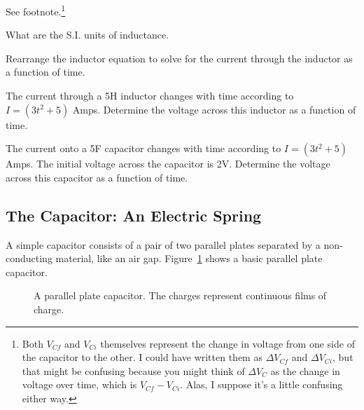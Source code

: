 See footnote.\footnote{Both $V_{Cf}$ and $V_{Ci}$ themselves represent the change in voltage from one side of the capacitor to the other. I could have written them as $\Delta V_{Cf}$ and $\Delta V_{Ci}$, but that might be confusing because you might think of $\Delta V_C$ as the change in voltage over time, which is $V_{Cf}-V_{Ci}$. Alas, I suppose it's a little confusing either way.}

\begin{alevel}
What are the S.I. units of inductance.
\end{alevel}

\begin{clevel}
Rearrange the inductor equation to solve for the current through the inductor as a function of time.
\end{clevel}

\begin{blevel}
The current through a 5H inductor changes with time according to $I=(3t^2+5)$ Amps. Determine the voltage across this inductor as a function of time. 
\end{blevel}

\begin{clevel}
The current onto a 5F capacitor changes with time according to $I=(3t^2+5)$ Amps. The initial voltage across the capacitor is 2V. Determine the voltage across this capacitor as a function of time. 
\end{clevel}

\subsection{The Capacitor: An Electric Spring}
A simple capacitor consists of a pair of two parallel plates separated by a non-conducting material, like an air gap. Figure~\ref{F:6CAP0} shows a basic parallel plate capacitor. 
\\
\begin{figure}[H]
\begin{center}
\caption{A parallel plate capacitor. The charges represent continuous films of charge.}
\label{F:6CAP0}
\end{center}
\end{figure}

